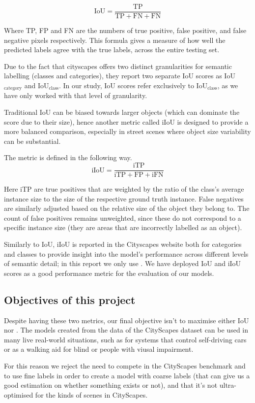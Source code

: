\begin{equation*}
	\text{IoU} = \frac{\text{TP}}{\text{TP} + \text{FN} + \text{FN}}
\end{equation*}

Where TP, FP and FN are the numbers of true positive, false positive, and false negative pixels respectively.
This formula gives a measure of how well the predicted labels agree with the true labels, across the entire testing set.

Due to the fact that cityscapes offers two distinct granularities for semantic labelling (classes and categories), they report two separate IoU scores as IoU$_\text{category}$ and IoU$_\text{class}$. In our study, IoU scores refer exclusively to IoU$_\text{class}$, as we have only worked with that level of granularity.

Traditional IoU can be biased towards larger objects (which can dominate the score due to their size), hence another metric called iIoU is designed to provide a more balanced comparison, especially in street scenes where object size variability can be substantial.

The metric is defined in the following way.
\begin{equation*}
	\text{iIoU} = \frac{\text{iTP}}{\text{iTP} + \text{FP} + \text{iFN}}	
\end{equation*}

Here iTP are true positives that are weighted by the ratio of the class's average instance size to the size of the respective ground truth instance. False negatives are similarly adjusted based on the relative size of the object they belong to. The count of false positives remains unweighted, since these do not correspond to a specific instance size (they are areas that are incorrectly labelled as an object).

Similarly to IoU, iIoU is reported in the Cityscapes website both for categories and classes to provide insight into the model's performance across different levels of semantic detail; in this report we only use \iiouc{}.
We have deployed IoU and iIoU scores as a good performance metric for the evaluation of our models. 

\subsection{Objectives of this project}

Despite having these two metrics, our final objective isn't to maximise either IoU nor \iiouc{}.
The models created from the data of the CityScapes dataset can be used in many live real-world situations, such as for systems that control self-driving cars or as a walking aid for blind or people with viusal impairment.

For this reason we reject the need to compete in the CityScapes benchmark\cite{cityscapes_benchmark} and to use fine labels in order to create a model with coarse labels (that can give us a good estimation on whether something exists or not), and that it's not ultra-optimised for the kinds of scenes in CityScapes.
